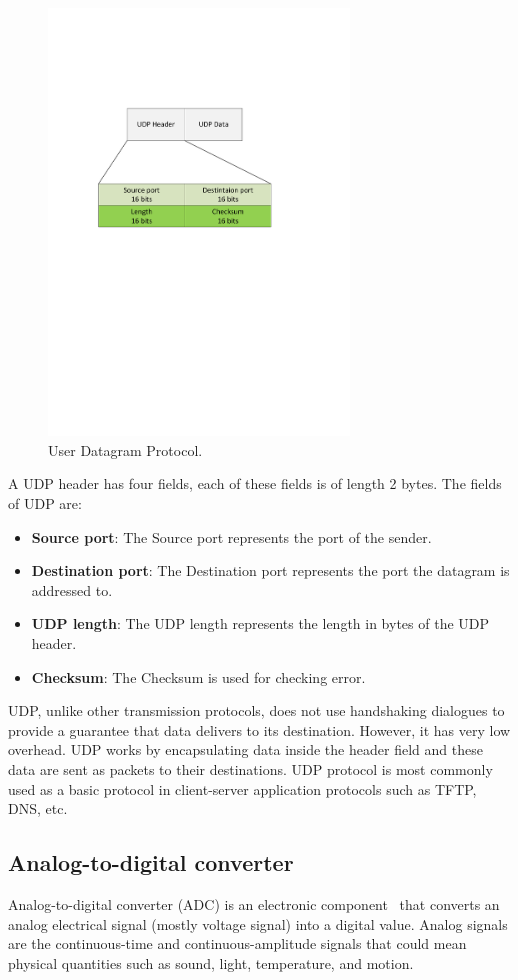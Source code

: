 \begin{figure}[hbt]
\centering
\includegraphics[trim=80 400 150 150, clip, width=80mm]{images/UDP.pdf}
\caption{User Datagram Protocol.}
\label{fig:UDP}
\end{figure}

A \acrshort{UDP} header has four fields, each of these fields is of length 2 bytes. The fields of UDP are:
\begin{itemize}[]
\item{\textbf{Source port}}: The Source port represents the port of the sender.
\item{\textbf{Destination port}}: The Destination port represents the port the datagram is addressed to.   
\item{\textbf{UDP length}}: The UDP length represents the length in bytes of the UDP header. 
\item{\textbf{Checksum}}: The Checksum is used for checking error. 
\end{itemize}

UDP, unlike other transmission protocols, does not use handshaking dialogues to provide a guarantee that data delivers to its destination. 
However, it has very low overhead. UDP works by encapsulating data inside the header field and these data are sent as packets to their destinations. 
UDP protocol is most commonly used as a basic protocol in client-server application protocols such as TFTP, DNS, etc.

\subsection{Analog-to-digital converter}\label{sec:ADC}
Analog-to-digital converter (ADC) is an electronic component~\cite{Rauth2005a} that converts an analog electrical signal (mostly voltage signal) into a digital value.  
Analog signals are the continuous-time and continuous-amplitude signals that could mean physical quantities such as sound, light, temperature, and motion.

